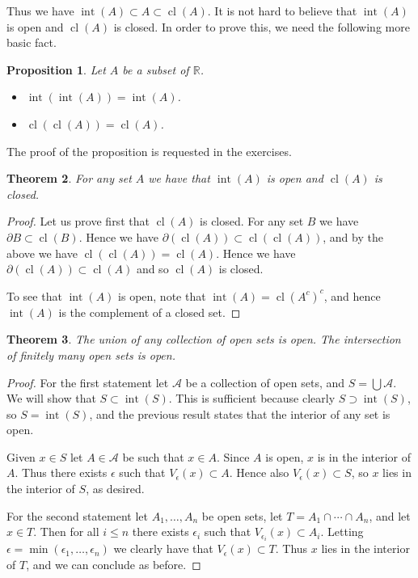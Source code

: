 \documentclass[11pt,oneside]{amsbook}
\newcommand{\R}{\mathbb R}
\DeclareMathOperator{\cl}{cl}
\DeclareMathOperator{\inte}{int}
\theoremstyle{definition}
\theoremstyle{plain}
\newtheorem{thm}{Theorem}[section]
\newtheorem{prop}[thm]{Proposition}
\theoremstyle{definition}
\theoremstyle{remark}
\numberwithin{equation}{section}
\numberwithin{figure}{section}
\begin{document}
Thus we have $\inte(A)\subset A\subset\cl(A)$. It is not hard to believe that $\inte(A)$ is open and $\cl(A)$ is closed. In order to prove this, we need the following more basic fact.

\begin{prop}
  \label{prop:closure}
  Let $A$ be a subset of $\R$.
  \begin{itemize}
    \item $\inte(\inte(A))=\inte(A)$.
    \item $\cl(\cl(A))=\cl(A)$.
  \end{itemize}
\end{prop}

The proof of the proposition is requested in the exercises.

\begin{thm}
  For any set $A$ we have that $\inte(A)$ is open and $\cl(A)$ is closed.
\end{thm}

\begin{proof}
  Let us prove first that $\cl(A)$ is closed. For any set $B$ we have $\partial B\subset \cl(B)$. Hence we have $\partial(\cl(A))\subset\cl(\cl(A))$, and by the above we have $\cl(\cl(A))=\cl(A)$. Hence we have $\partial(\cl(A))\subset\cl(A)$ and so $\cl(A)$ is closed.
  
  To see that $\inte(A)$ is open, note that $\inte(A)=\cl(A^c)^c$, and hence $\inte(A)$ is the complement of a closed set.
\end{proof}

\begin{thm}
  The union of any collection of open sets is open. The intersection of finitely many open sets is open.
\end{thm}

\begin{proof}
  For the first statement let $\mathcal A$ be a collection of open sets, and $S=\bigcup\mathcal A$. We will show that $S\subset\inte(S)$. This is sufficient because clearly $S\supset\inte(S)$, so $S=\inte(S)$, and the previous result states that the interior of any set is open.
  
  Given $x\in S$ let $A\in\mathcal A$ be such that $x\in A$. Since $A$ is open, $x$ is in the interior of $A$. Thus there exists $\epsilon$ such that $V_\epsilon(x)\subset A$. Hence also $V_\epsilon(x)\subset S$, so $x$ lies in the interior of $S$, as desired.

  For the second statement let $A_1,\ldots,A_n$ be open sets, let $T=A_1\cap\cdots\cap A_n$, and let $x\in T$. Then for all $i\leq n$ there exists $\epsilon_i$ such that $V_{\epsilon_i}(x)\subset A_i$. Letting $\epsilon=\min(\epsilon_1,\ldots,\epsilon_n)$ we clearly have that $V_\epsilon(x)\subset T$. Thus $x$ lies in the interior of $T$, and we can conclude as before.
\end{proof}
\end{document}
